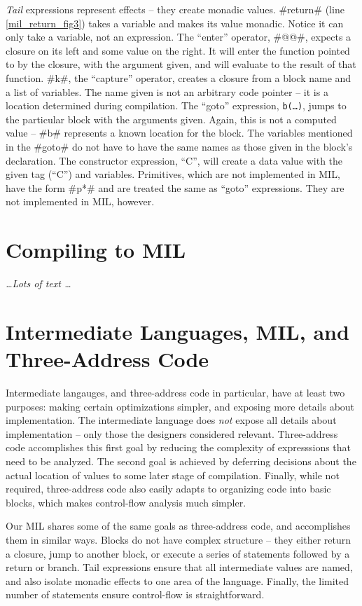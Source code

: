 \documentclass[12pt]{report}
\begin{document}
\emph{Tail} expressions represent effects -- they create monadic
values. #return# (line \ref{mil_return_fig3}) takes a variable and
makes its value monadic. Notice it can only take a variable, not an
expression.  The ``enter'' operator, #@@#, expects a closure on its
left and some value on the right. It will enter the function pointed
to by the closure, with the argument given, and will evaluate to the
result of that function. #k#, the ``capture'' operator, creates a
closure from a block name and a list of variables. The name given is
not an arbitrary code pointer -- it is a location determined during
compilation. The ``goto'' expression, \texttt{b(\dots)}, jumps to the
particular block with the arguments given. Again, this is not a
computed value -- #b# represents a known location for the block. The
variables mentioned in the #goto# do not have to have the same names
as those given in the block's declaration. The constructor expression,
``C'', will create a data value with the given tag (``C'') and
variables. Primitives, which are not implemented in MIL, have the form
#p*# and are treated the same as ``goto'' expressions. They are not 
implemented in MIL, however. 

\section{Compiling \lamA to MIL}

\emph{\dots Lots of text \dots}

\section{Intermediate Languages, MIL, and Three-Address Code}

Intermediate langauges, and three-address code in particular, have at
least two purposes: making certain optimizations simpler, and exposing
more details about implementation. The intermediate language does
\emph{not} expose all details about implementation -- only those the
designers considered relevant. Three-address code accomplishes this
first goal by reducing the complexity of expresssions that need to be
analyzed. The second goal is achieved by deferring decisions about the
actual location of values to some later stage of compilation.
Finally, while not required, three-address code also easily adapts to
organizing code into basic blocks, which makes control-flow analysis
much simpler.

Our MIL shares some of the same goals as three-address code, and
accomplishes them in similar ways. Blocks do not have complex
structure -- they either return a closure, jump to another block, or
execute a series of statements followed by a return or branch. Tail
expressions ensure that all intermediate values are named, and also 
isolate monadic effects to one area of the language. Finally, the limited
number of statements ensure control-flow is straightforward.
\end{document}
